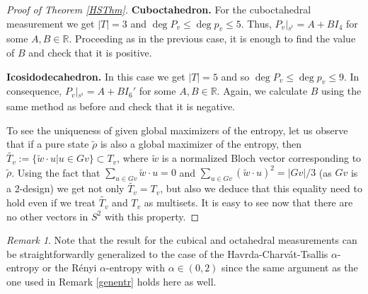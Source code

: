 \documentclass[11pt]{article}
\theoremstyle{remark}
\newtheorem{R}{Remark}
\theoremstyle{definition}
\begin{document}
\begin{proof}[Proof of Theorem \ref{HSThm}]
	{\bf Cuboctahedron.} For the cuboctahedral measurement we get $|T|=3$ and $\deg P_v\leq\deg p_v\leq 5$. Thus, $P_v|_{^{S^{2}}}=A+B I_4$ for some $A,B\in\mathbb R$. Proceeding as in the previous case, it is enough to find the value of $B$ and check that it is positive.
	
	{\bf Icosidodecahedron.} In this case we get $|T|=5$ and so $\deg P_v\leq\deg p_v\leq 9$. In consequence, $P_{v}|_{^{S^{2}}}=A +BI_6'$ for some $A,B\in \mathbb R$. Again, we calculate $B$ using the same method as before and check that it is negative.
	
	To see the uniqueness of given global maximizers of the entropy, let us observe that if a pure state $\tilde{\rho}$ is also a global maximizer of the entropy, then $\widetilde{T_v}:=\{\tilde{w}\cdot u|u\in Gv\}\subset T_v$, where $\tilde{w}$ is a normalized Bloch vector corresponding to $\tilde{\rho}$. Using the fact that $\sum_{u\in Gv}\tilde{w}\cdot u=0$ and $\sum_{u\in Gv}(\tilde{w}\cdot u)^2=|Gv|/3$ (as $Gv$ is a 2-design) we get not only $\widetilde{T_v}= T_v$, but also we deduce that this equality need to hold even if we treat $\widetilde{T_v}$ and $T_v$ as multisets. It is easy to see now that there are no other vectors in $S^2$ with this property. 
\end{proof}

\begin{R}
	Note that the result for the cubical and octahedral measurements can be straightforwardly generalized to the case of the Havrda-Charv\'at-Tsallis $\alpha$-entropy or the R\'enyi $\alpha$-entropy with $\alpha\in(0,2)$ since the same argument as the one used in Remark \ref{genentr} holds here as well. 
\end{R}
\end{document}
